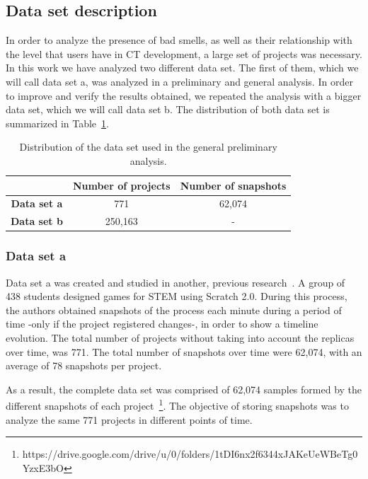 \subsection{Data set description}
\label{subsec:descrip_dataset}

In order to analyze the presence of bad smells, as well as their relationship with the level that users have in CT development, a large set of projects was necessary. In this work we have analyzed two different data set. The first of them, which we will call data set a, was analyzed in a preliminary and general analysis. In order to improve and verify the results obtained, we repeated the analysis with a bigger data set, which we will call data set b. The distribution of both data set is summarized in Table~\ref{table:dataset_distribution}.

\begin{table}
 \begin{center}
  \begin{tabular}{|c|c|c|}
    \hline
    & \textbf{Number of projects} & \textbf{Number of snapshots} \\ \hline
    \textbf{Data set a} & 771 & 62,074 \\ \hline
    \textbf{Data set b} & 250,163 & - \\ \hline
  \end{tabular}
  \caption{Distribution of the data set used in the general preliminary analysis.}
  \label{table:dataset_distribution}
 \end{center}
\end{table}


\subsubsection{Data set a}
\label{subsubsec:dataset_a}

Data set a was created and studied in another, previous research~\cite{troiano2019my}. A group of 438 students designed games for STEM using Scratch 2.0. During this process, the authors obtained snapshots of the process each minute during a period of time -only if the project registered changes-, in order to show a timeline evolution. The total number of projects without taking into account the replicas over time, was 771. The total number of snapshots over time were 62,074, with an average of 78 snapshots per project.

As a result, the complete data set was comprised of 62,074 samples formed by the different snapshots of each project~\footnote{https://drive.google.com/drive/u/0/folders/1tDI6nx2f6344xJAKeUeWBeTg0YzxE3bO}. The objective of storing snapshots was to analyze the same 771 projects in different points of time.

